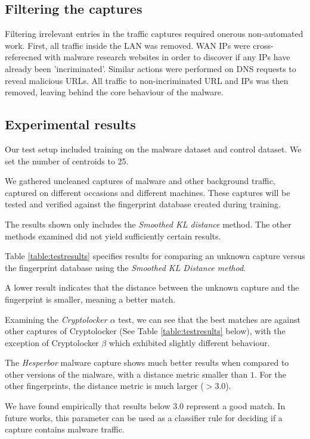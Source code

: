 \documentclass[9pt,journal,compsoc]{IEEEtran}
\begin{document}
\subsection{Filtering the captures}
Filtering irrelevant entries in the traffic captures required onerous non-automated work.
First, all traffic inside the LAN was removed. WAN IPs were cross-referecned with malware research websites in order to discover if any IPs have already been 'incriminated'.
Similar actions were performed on DNS requests to reveal malicious URLs.
All traffic to non-incriminated URL and IPs was then removed, leaving behind the core behaviour of the malware.

\subsection{Experimental results}
Our test setup included training on the malware dataset and control dataset.
We set the number of centroids to 25.

We gathered uncleaned captures of malware and other background traffic, captured on different occasions and different machines. These captures will be tested and verified against the fingerprint database created during training.

The results shown only includes the {\em Smoothed KL distance} method. The other methods examined did not yield sufficiently certain results.

Table \ref{table:testresults} specifies results for comparing an unknown capture versus the fingerprint database using the {\em Smoothed KL Distance method}.

A lower result indicates that the distance between the unknown capture and the fingerprint is smaller, meaning a better match.

Examining the \emph{Cryptolocker $\alpha$} test, we can see that the best matches are against other captures of Cryptolocker (See Table \ref{table:testresults} below), with the exception of Cryptolocker $\beta$ which exhibited slightly different behaviour.

The \emph{Hesperbor} malware capture shows much better results when compared to other versions of the malware, with a distance metric smaller than $1$.
For the other fingerprints, the distance metric is much larger ($>3.0$).

We have found empirically that results below $3.0$ represent a good match. In future works, this parameter can be used as a classifier rule for deciding if a capture contains malware traffic.
\end{document}
